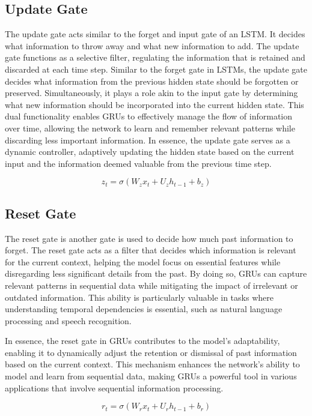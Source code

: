 \documentclass{report}
\begin{document}
\subsection{Update Gate}
The update gate acts similar to the forget and input gate of an LSTM. It decides what information to throw away and what new information to add. The update gate functions as a selective filter, regulating the information that is retained and discarded at each time step. Similar to the forget gate in LSTMs, the update gate decides what information from the previous hidden state should be forgotten or preserved. Simultaneously, it plays a role akin to the input gate by determining what new information should be incorporated into the current hidden state. This dual functionality enables GRUs to effectively manage the flow of information over time, allowing the network to learn and remember relevant patterns while discarding less important information. In essence, the update gate serves as a dynamic controller, adaptively updating the hidden state based on the current input and the information deemed valuable from the previous time step.

   \[
   z_t = \sigma(W_{z} x_t + U_{z} h_{t-1} + b_{z})
   \]



\subsection{Reset Gate}
The reset gate is another gate is used to decide how much past information to forget. The reset gate acts as a filter that decides which information is relevant for the current context, helping the model focus on essential features while disregarding less significant details from the past. By doing so, GRUs can capture relevant patterns in sequential data while mitigating the impact of irrelevant or outdated information. This ability is particularly valuable in tasks where understanding temporal dependencies is essential, such as natural language processing and speech recognition.

In essence, the reset gate in GRUs contributes to the model's adaptability, enabling it to dynamically adjust the retention or dismissal of past information based on the current context. This mechanism enhances the network's ability to model and learn from sequential data, making GRUs a powerful tool in various applications that involve sequential information processing.

   \[
   r_t = \sigma(W_{r} x_t + U_{r} h_{t-1} + b_{r})
   \]
\end{document}
